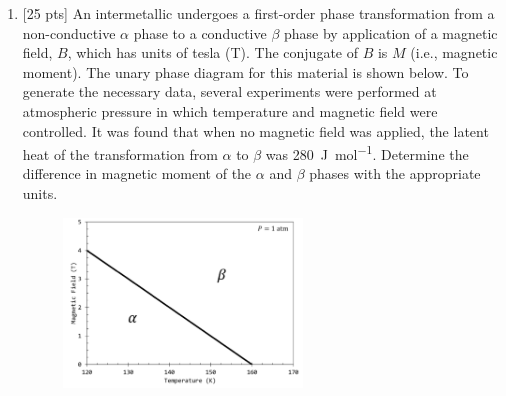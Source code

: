 
\DeclareSIUnit{}





\pagebreak

\begin{enumerate}
  \item {[25 pts]} An intermetallic undergoes a first-order phase
    transformation from a non-conductive $\alpha$
    phase to a conductive $\beta$ phase by application of a magnetic
    field, $B$, which has units of tesla (T). The
    conjugate of $B$ is $M$ (i.e., magnetic moment). The unary phase
    diagram for this material is shown
    below. To generate the necessary data, several experiments were
    performed at atmospheric pressure in
    which temperature and magnetic field were controlled. It was
    found that when no magnetic field was
    applied, the latent heat of the transformation from $\alpha$ to
    $\beta$ was \SI{280}{\joule\per\mole}. Determine the difference in
    magnetic moment of the $\alpha$ and $\beta$ phases with the
    appropriate units.

    \begin{figure}[h]
      \centering
      \includegraphics[width=0.6\textwidth]{./assets/fig_1.png}
    \end{figure}

\end{enumerate}

